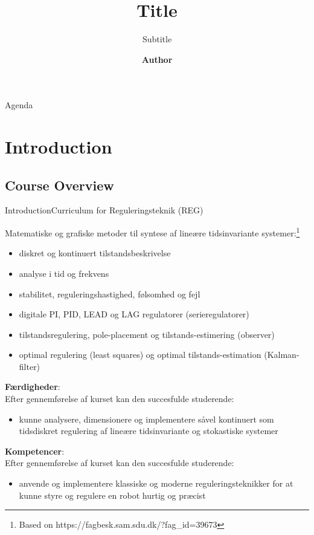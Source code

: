 \documentclass[aspectratio=169,10pt,t]{beamer}
\title{Title}
\subtitle{Subtitle}
\date{ }
\author{
  \textbf{Author}
}
\institute[
  SDU Robotics\\
  The Maersk Mc-Kinney Moller Institute\\
  University of Southern Denmark
] %
{%
  SDU Robotics\\
  The Maersk Mc-Kinney Moller Institute\\
  University of Southern Denmark

}
\begin{document}
{\SDUwavesbg%
\begin{frame} %
  \titlepage
\end{frame}}

\begin{frame}{Agenda}{\vphantom{(y}}
\tableofcontents
\end{frame}

\section{Introduction}


\subsection{Course Overview}
\begin{frame}{Introduction}{Curriculum for Reguleringsteknik (REG)\vphantom{(y}}
\vspace{-0.7em}
{\footnotesize Matematiske og grafiske metoder til syntese af {\color{red}lineære tidsinvariante systemer}:\footnote{{\tiny Based on https://fagbesk.sam.sdu.dk/?fag\_id=39673}}
\begin{itemize}
\item {\color{red}diskret og kontinuert tilstandsbeskrivelse}
\item analyse i tid og frekvens
\item stabilitet, reguleringshastighed, følsomhed og fejl
\item digitale PI, PID, LEAD og LAG regulatorer (serieregulatorer)
\item tilstandsregulering, pole-placement og tilstands-estimering (observer)
\item optimal regulering (least squares) og optimal tilstands-estimation (Kalman-filter)
\end{itemize}
\vspace{0.5em}
\textbf{Færdigheder}:\\
Efter gennemførelse af kurset kan den succesfulde studerende:
\begin{itemize}
\item kunne analysere, dimensionere og implementere såvel kontinuert som tidsdiskret regulering af lineære tidsinvariante og stokastiske systemer
\end{itemize}
\vspace{0.5em}
\textbf{Kompetencer}:\\
Efter gennemførelse af kurset kan den succesfulde studerende:
\begin{itemize}
\item anvende og implementere klassiske og moderne reguleringsteknikker for at kunne styre og regulere en robot hurtig og præcist
\end{itemize}}
\end{frame}
\end{document}
